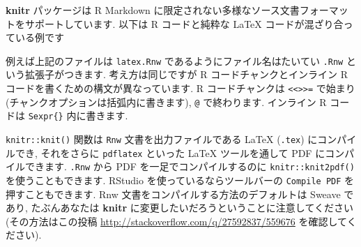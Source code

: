 \documentclass[
  11pt,
]{bxjsreport}
\newenvironment{Shaded}{\begin{snugshade}}{\end{snugshade}}
\newcommand{\BuiltInTok}[1]{#1}
\newcommand{\ExtensionTok}[1]{#1}
\newcommand{\FunctionTok}[1]{\textcolor[rgb]{0.00,0.00,0.00}{#1}}
\newcommand{\KeywordTok}[1]{\textcolor[rgb]{0.13,0.29,0.53}{\textbf{#1}}}
\newcommand{\NormalTok}[1]{#1}
\newcommand{\SpecialCharTok}[1]{\textcolor[rgb]{0.00,0.00,0.00}{#1}}
\newcommand{\SpecialStringTok}[1]{\textcolor[rgb]{0.31,0.60,0.02}{#1}}
\begin{document}
\textbf{knitr} パッケージは R Markdown に限定されない多様なソース文書フォーマットをサポートしています. 以下は R コードと純粋な LaTeX コードが混ざり合っている例です

\begin{Shaded}
\end{Shaded}

例えば上記のファイルは \texttt{latex.Rnw} であるようにファイル名はたいてい \texttt{.Rnw} という拡張子がつきます. 考え方は同じですが R コードチャンクとインライン R コードを書くための構文が異なっています. R コードチャンクは \texttt{\textless{}\textless{}\textgreater{}\textgreater{}=} で始まり (チャンクオプションは括弧内に書きます), \texttt{@} で終わります. インライン R コードは \texttt{Sexpr\{\}} 内に書きます.

\texttt{knitr::knit()} 関数は \texttt{Rnw} 文書を出力ファイルである LaTeX (\texttt{.tex}) にコンパイルでき, それをさらに \texttt{pdflatex} といった LaTeX ツールを通して PDF にコンパイルできます. \texttt{.Rnw} から PDF を一足でコンパイルするのに \texttt{knitr::knit2pdf()} を使うこともできます. RStudio を使っているならツールバーの \texttt{Compile PDF} を押すこともできます. Rnw 文書をコンパイルする方法のデフォルトは Sweave であり, たぶんあなたは \textbf{knitr} に変更したいだろうということに注意してください (その方法はこの投稿 \url{http://stackoverflow.com/q/27592837/559676} を確認してください).
\end{document}
